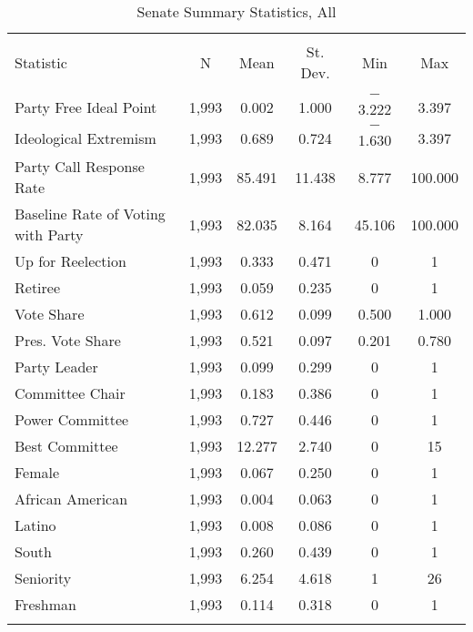 \documentclass[12pt]{article}
\begin{document}
\begin{table}[H] 
	\centering 
	\singlespacing
	\caption{Senate Summary Statistics, All} 
	\label{} 
	\begin{tabular}{@{\extracolsep{5pt}}lccccc} 
		\\[-1.8ex]\hline 
		\hline \\[-1.8ex] 
		Statistic & \multicolumn{1}{c}{N} & \multicolumn{1}{c}{Mean} & \multicolumn{1}{c}{St. Dev.} & \multicolumn{1}{c}{Min} & \multicolumn{1}{c}{Max} \\ 
		\hline \\[-1.8ex] 
		Party Free Ideal Point & 1,993 & 0.002 & 1.000 & $-$3.222 & 3.397 \\ 
		Ideological Extremism & 1,993 & 0.689 & 0.724 & $-$1.630 & 3.397 \\ 
		Party Call Response Rate & 1,993 & 85.491 & 11.438 & 8.777 & 100.000 \\ 
		Baseline Rate of Voting with Party & 1,993 & 82.035 & 8.164 & 45.106 & 100.000 \\ 
		Up for Reelection & 1,993 & 0.333 & 0.471 & 0 & 1 \\ 
		Retiree & 1,993 & 0.059 & 0.235 & 0 & 1 \\ 
		Vote Share & 1,993 & 0.612 & 0.099 & 0.500 & 1.000 \\ 
		Pres. Vote Share & 1,993 & 0.521 & 0.097 & 0.201 & 0.780 \\ 
		Party Leader & 1,993 & 0.099 & 0.299 & 0 & 1 \\ 
		Committee Chair & 1,993 & 0.183 & 0.386 & 0 & 1 \\ 
		Power Committee & 1,993 & 0.727 & 0.446 & 0 & 1 \\ 
		Best Committee & 1,993 & 12.277 & 2.740 & 0 & 15 \\ 
		Female & 1,993 & 0.067 & 0.250 & 0 & 1 \\ 
		African American & 1,993 & 0.004 & 0.063 & 0 & 1 \\ 
		Latino & 1,993 & 0.008 & 0.086 & 0 & 1 \\ 
		South & 1,993 & 0.260 & 0.439 & 0 & 1 \\ 
		Seniority & 1,993 & 6.254 & 4.618 & 1 & 26 \\ 
		Freshman & 1,993 & 0.114 & 0.318 & 0 & 1 \\ 
		
		\hline \\[-1.8ex] 
	\end{tabular} 
\end{table} 
\end{document}
